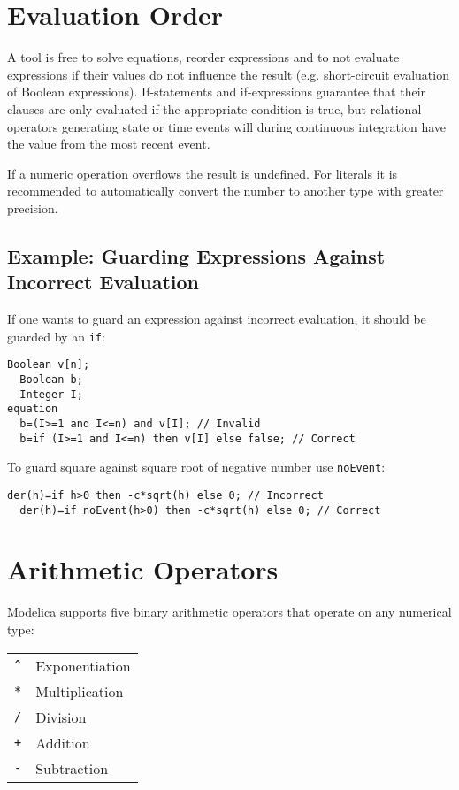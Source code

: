 \section{Evaluation Order}

A tool is free to solve equations, reorder expressions and to not
evaluate expressions if their values do not influence the result (e.g.
short-circuit evaluation of Boolean expressions). If-statements and
if-expressions guarantee that their clauses are only evaluated if the
appropriate condition is true, but relational operators generating state
or time events will during continuous integration have the value from
the most recent event.

If a numeric operation overflows the result is undefined. For literals
it is recommended to automatically convert the number to another type
with greater precision.

\subsection{Example: Guarding Expressions Against Incorrect Evaluation}

\begin{example}
If one wants to guard an expression against incorrect evaluation, it should be guarded by an \lstinline!if!:
\begin{lstlisting}[language=modelica]
  Boolean v[n];
  Boolean b;
  Integer I;
equation
  b=(I>=1 and I<=n) and v[I]; // Invalid
  b=if (I>=1 and I<=n) then v[I] else false; // Correct
\end{lstlisting}

To guard square against square root of negative number use \lstinline!noEvent!:
\begin{lstlisting}[language=modelica]
  der(h)=if h>0 then -c*sqrt(h) else 0; // Incorrect
  der(h)=if noEvent(h>0) then -c*sqrt(h) else 0; // Correct
\end{lstlisting}
\end{example}

\section{Arithmetic Operators}

Modelica supports five binary arithmetic operators that operate on any
numerical type:
\begin{longtable}[c]{ll}
\lstinline!^! & Exponentiation\\
\lstinline!*! & Multiplication\\
\lstinline!/! & Division\\
\lstinline!+! & Addition\\
\lstinline!-! & Subtraction\\
\end{longtable}

